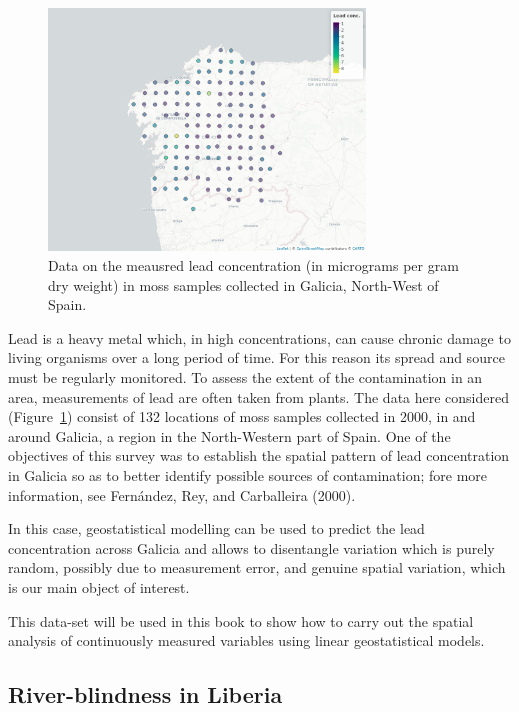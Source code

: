 \documentclass[
  letterpaper,
]{krantz}
\begin{document}
\begin{figure}

{\centering \includegraphics[width=3.31in,height=\textheight]{./figures/galicia_ch1.png}

}

\caption{\label{fig-galicia-ch1}Data on the meausred lead concentration
(in micrograms per gram dry weight) in moss samples collected in
Galicia, North-West of Spain.}

\end{figure}

Lead is a heavy metal which, in high concentrations, can cause chronic
damage to living organisms over a long period of time. For this reason
its spread and source must be regularly monitored. To assess the extent
of the contamination in an area, measurements of lead are often taken
from plants. The data here considered (Figure~\ref{fig-galicia-ch1})
consist of 132 locations of moss samples collected in 2000, in and
around Galicia, a region in the North-Western part of Spain. One of the
objectives of this survey was to establish the spatial pattern of lead
concentration in Galicia so as to better identify possible sources of
contamination; fore more information, see Fernández, Rey, and
Carballeira (2000).

In this case, geostatistical modelling can be used to predict the lead
concentration across Galicia and allows to disentangle variation which
is purely random, possibly due to measurement error, and genuine spatial
variation, which is our main object of interest.

This data-set will be used in this book to show how to carry out the
spatial analysis of continuously measured variables using linear
geostatistical models.

\hypertarget{river-blindness-in-liberia}{%
\subsection{River-blindness in
Liberia}\label{river-blindness-in-liberia}}
\end{document}
